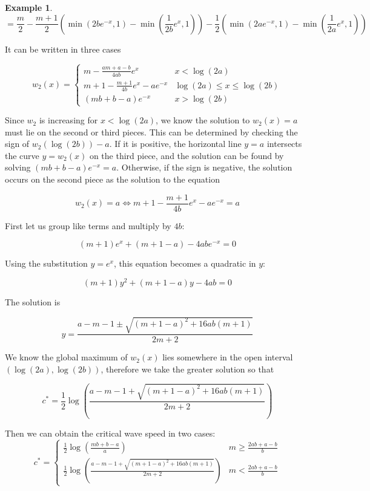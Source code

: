 \documentclass[11pt]{article}
\theoremstyle{definition}
\newtheorem{ex}[thm]{Example}
\numberwithin{equation}{section}
\numberwithin{thm}{section}
\begin{document}
\begin{ex}
$$ = \frac{m}{2} - \frac{m+1}{2}\left( \min(2be^{-x},1) - \min(\frac{1}{2b}e^{x},1) \right) - \frac{1}{2} \left( \min(2ae^{-x},1) - \min(\frac{1}{2a}e^{x},1) \right) $$

It can be written in three cases

$$ w_2(x) = \begin{cases} \displaystyle
m - \frac{am+a-b}{4ab} e^x & x <\log(2a) \\
\displaystyle
m + 1 - \frac{m+1}{4b} e^x - ae^{-x} & \log(2a) \leq x \leq \log(2b) \\
\displaystyle
(mb+b-a) e^{-x}  & x > \log(2b)
\end{cases} $$

Since $w_2$ is increasing for $x<\log(2a)$, we know the solution to $w_2(x)=a$ must lie on the second or third pieces. This can be determined by checking the sign of $w_2(\log(2b))-a$. If it is positive, the horizontal line $y=a$ intersects the curve $y=w_2(x)$ on the third piece, and the solution can be found by solving $(mb+b-a)e^{-x}=a$. Otherwise, if the sign is negative, the solution occurs on the second piece as the solution to the equation

$$ w_2(x)=a \iff m + 1 - \frac{m+1}{4b} e^x - ae^{-x} = a $$

First let us group like terms and multiply by $4b$:

$$ (m+1) e^x + (m + 1 - a) - 4abe^{-x} = 0 $$

Using the substitution $y=e^x$, this equation becomes a quadratic in $y$:

$$ (m+1) y^2 + (m + 1 - a) y - 4ab = 0 $$

The solution is

$$ y = \frac{a-m-1 \pm \sqrt{(m+1-a)^2 + 16ab(m+1)}}{2m+2}$$

We know the global maximum of $w_2(x)$ lies somewhere in the open interval $(\log(2a),\log(2b))$, therefore we take the greater solution so that

$$ c^* = \frac{1}{2} \log\left(  \frac{a-m-1 + \sqrt{(m+1-a)^2 + 16ab(m+1)}}{2m+2} \right) $$

Then we can obtain the critical wave speed in two cases:
$$ c^* = \begin{cases} \displaystyle
\frac{1}{2} \log \left( \frac{mb+b-a}{a} \right) & m \geq \frac{2ab+a-b}{b} \\
\displaystyle
 \frac{1}{2} \log\left(  \frac{a-m-1 + \sqrt{(m+1-a)^2 + 16ab(m+1)}}{2m+2} \right) & m < \frac{2ab+a-b}{b}
\end{cases} $$


\end{ex}
\end{document}
